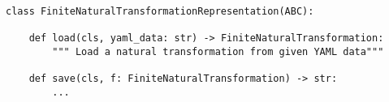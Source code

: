 \begin{verbatim}
class FiniteNaturalTransformationRepresentation(ABC):

    def load(cls, yaml_data: str) -> FiniteNaturalTransformation:
        """ Load a natural transformation from given YAML data"""

    def save(cls, f: FiniteNaturalTransformation) -> str:
        ...
\end{verbatim}